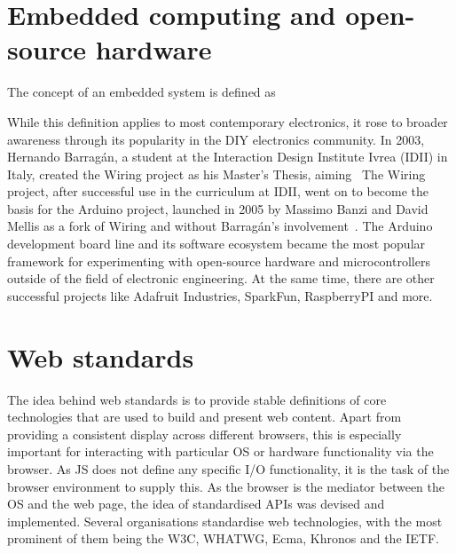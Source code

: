 \section{Embedded computing and open-source hardware}
\label{sec:embeddedcomputing}

The concept of an embedded system is defined as~

While this definition applies to most contemporary electronics, it rose to broader awareness through its popularity in the \ac{DIY} electronics community.
In 2003, Hernando Barragán, a student at the Interaction Design Institute Ivrea (IDII) in Italy, created the Wiring project as his Master's Thesis, aiming~ The Wiring project, after successful use in the curriculum at IDII, went on to become the basis for the Arduino project, launched in 2005 by Massimo Banzi and David Mellis as a fork of Wiring and without Barragán's involvement~\parencite{arduinoHistory}.
The Arduino development board line and its software ecosystem became the most popular framework for experimenting with open-source hardware and microcontrollers outside of the field of electronic engineering. At the same time, there are other successful projects like Adafruit Industries, SparkFun, RaspberryPI and more.


\section{Web standards}
\label{sec:webstandards}

The idea behind web standards is to provide stable definitions of core technologies that are used to build and present web content.
Apart from providing a consistent display across different browsers, this is especially important for interacting with particular \ac{OS} or hardware functionality via the browser.
As \ac{JS} does not define any specific \ac{I/O} functionality, it is the task of the browser environment to supply this.
As the browser is the mediator between the \ac{OS} and the web page, the idea of standardised \ac{API}s was devised and implemented.
Several organisations standardise web technologies, with the most prominent of them being the \ac{W3C}, \ac{WHATWG}, Ecma, Khronos and the \ac{IETF}.

